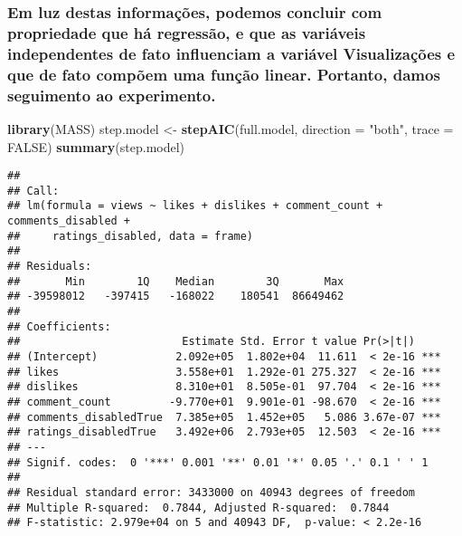 \documentclass[]{article}
\newenvironment{Shaded}{\begin{snugshade}}{\end{snugshade}}
\newcommand{\DataTypeTok}[1]{\textcolor[rgb]{0.13,0.29,0.53}{#1}}
\newcommand{\KeywordTok}[1]{\textcolor[rgb]{0.13,0.29,0.53}{\textbf{#1}}}
\newcommand{\NormalTok}[1]{#1}
\newcommand{\OtherTok}[1]{\textcolor[rgb]{0.56,0.35,0.01}{#1}}
\newcommand{\StringTok}[1]{\textcolor[rgb]{0.31,0.60,0.02}{#1}}
\begin{document}
\hypertarget{em-luz-destas-informacoes-podemos-concluir-com-propriedade-que-ha-regressao-e-que-as-variaveis-independentes-de-fato-influenciam-a-variavel-visualizacoes-e-que-de-fato-compoem-uma-funcao-linear.-portanto-damos-seguimento-ao-experimento.}{%
\subsubsection{Em luz destas informações, podemos concluir com
propriedade que há regressão, e que as variáveis independentes de fato
influenciam a variável Visualizações e que de fato compõem uma função
linear. Portanto, damos seguimento ao
experimento.}\label{em-luz-destas-informacoes-podemos-concluir-com-propriedade-que-ha-regressao-e-que-as-variaveis-independentes-de-fato-influenciam-a-variavel-visualizacoes-e-que-de-fato-compoem-uma-funcao-linear.-portanto-damos-seguimento-ao-experimento.}}

\begin{Shaded}
\begin{Highlighting}[]
 \KeywordTok{library}\NormalTok{(MASS)}
\NormalTok{ step.model <-}\StringTok{ }\KeywordTok{stepAIC}\NormalTok{(full.model, }\DataTypeTok{direction =} \StringTok{"both"}\NormalTok{, }\DataTypeTok{trace =} \OtherTok{FALSE}\NormalTok{)}
 \KeywordTok{summary}\NormalTok{(step.model)}
\end{Highlighting}
\end{Shaded}

\begin{verbatim}
## 
## Call:
## lm(formula = views ~ likes + dislikes + comment_count + comments_disabled + 
##     ratings_disabled, data = frame)
## 
## Residuals:
##       Min        1Q    Median        3Q       Max 
## -39598012   -397415   -168022    180541  86649462 
## 
## Coefficients:
##                         Estimate Std. Error t value Pr(>|t|)    
## (Intercept)            2.092e+05  1.802e+04  11.611  < 2e-16 ***
## likes                  3.558e+01  1.292e-01 275.327  < 2e-16 ***
## dislikes               8.310e+01  8.505e-01  97.704  < 2e-16 ***
## comment_count         -9.770e+01  9.901e-01 -98.670  < 2e-16 ***
## comments_disabledTrue  7.385e+05  1.452e+05   5.086 3.67e-07 ***
## ratings_disabledTrue   3.492e+06  2.793e+05  12.503  < 2e-16 ***
## ---
## Signif. codes:  0 '***' 0.001 '**' 0.01 '*' 0.05 '.' 0.1 ' ' 1
## 
## Residual standard error: 3433000 on 40943 degrees of freedom
## Multiple R-squared:  0.7844, Adjusted R-squared:  0.7844 
## F-statistic: 2.979e+04 on 5 and 40943 DF,  p-value: < 2.2e-16
\end{verbatim}
\end{document}

